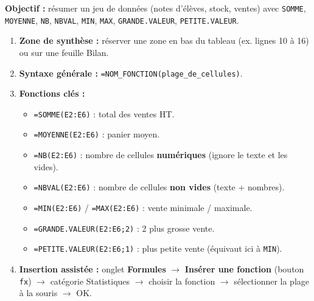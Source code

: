 \documentclass[11pt]{article}
\begin{document}
\begin{methode}
\textbf{Objectif :} résumer un jeu de données (notes d'élèves, stock, ventes) avec \texttt{SOMME}, \texttt{MOYENNE}, \texttt{NB}, \texttt{NBVAL}, \texttt{MIN}, \texttt{MAX}, \texttt{GRANDE.VALEUR}, \texttt{PETITE.VALEUR}.
\begin{enumerate}
    \item \textbf{Zone de synthèse :} réserver une zone en bas du tableau (ex. lignes 10 à 16) ou sur une feuille \og{}Bilan\fg{}.
    \item \textbf{Syntaxe générale :} \texttt{=NOM\_FONCTION(plage\_de\_cellules)}.
    \item \textbf{Fonctions clés :}
    \begin{itemize}
        \item \texttt{=SOMME(E2:E6)} : total des ventes HT.
        \item \texttt{=MOYENNE(E2:E6)} : panier moyen.
        \item \texttt{=NB(E2:E6)} : nombre de cellules \textbf{numériques} (ignore le texte et les vides).
        \item \texttt{=NBVAL(E2:E6)} : nombre de cellules \textbf{non vides} (texte + nombres).
        \item \texttt{=MIN(E2:E6)} / \texttt{=MAX(E2:E6)} : vente minimale / maximale.
        \item \texttt{=GRANDE.VALEUR(E2:E6;2)} : 2 plus grosse vente.
        \item \texttt{=PETITE.VALEUR(E2:E6;1)} : plus petite vente (équivaut ici à \texttt{MIN}).
    \end{itemize}
    \item \textbf{Insertion assistée :} onglet \textbf{Formules} $\rightarrow$ \textbf{Insérer une fonction} (bouton \texttt{fx}) $\rightarrow$ catégorie \og{}Statistiques\fg{} $\rightarrow$ choisir la fonction $\rightarrow$ sélectionner la plage à la souris $\rightarrow$ OK.
\end{enumerate}
\end{methode}
\end{document}
